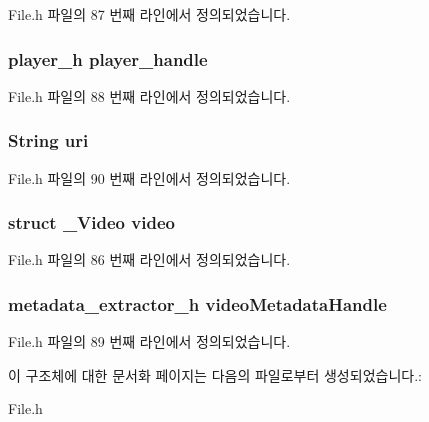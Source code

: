 File.\-h 파일의 87 번째 라인에서 정의되었습니다.

\hypertarget{struct__VideoExtends_acdbf0738be9fa70a60412d48cad881ee}{
\subsubsection[{player\-\_\-handle}]{\setlength{\rightskip}{0pt plus 5cm}player\-\_\-h player\-\_\-handle}}\label{struct__VideoExtends_acdbf0738be9fa70a60412d48cad881ee}


File.\-h 파일의 88 번째 라인에서 정의되었습니다.

\hypertarget{struct__VideoExtends_ac0b02717b928a36338653c49b0821365}{
\subsubsection[{uri}]{\setlength{\rightskip}{0pt plus 5cm}String uri}}\label{struct__VideoExtends_ac0b02717b928a36338653c49b0821365}


File.\-h 파일의 90 번째 라인에서 정의되었습니다.

\hypertarget{struct__VideoExtends_aa5784e2c1293cd9248e7bd28183fc1f8}{
\subsubsection[{video}]{\setlength{\rightskip}{0pt plus 5cm}struct {\bf \-\_\-\-Video} video}}\label{struct__VideoExtends_aa5784e2c1293cd9248e7bd28183fc1f8}


File.\-h 파일의 86 번째 라인에서 정의되었습니다.

\hypertarget{struct__VideoExtends_a0c761970ca029f0974eadbb58090641c}{
\subsubsection[{video\-Metadata\-Handle}]{\setlength{\rightskip}{0pt plus 5cm}metadata\-\_\-extractor\-\_\-h video\-Metadata\-Handle}}\label{struct__VideoExtends_a0c761970ca029f0974eadbb58090641c}


File.\-h 파일의 89 번째 라인에서 정의되었습니다.



이 구조체에 대한 문서화 페이지는 다음의 파일로부터 생성되었습니다.\-:\begin{DoxyCompactItemize}
\item 
File.\-h\end{DoxyCompactItemize}
